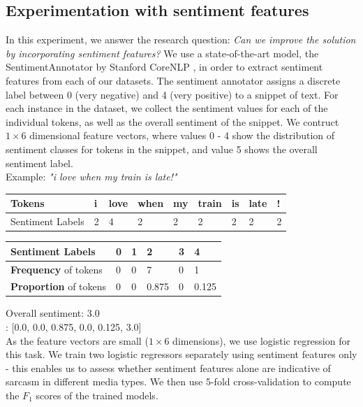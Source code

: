 \documentclass[12pt,a4paper]{article}
\begin{document}
\subsection{Experimentation with sentiment features}
\noindent In this experiment, we answer the research question: \textit{Can we improve the solution by incorporating sentiment features?} We use a state-of-the-art model, the SentimentAnnotator \cite{socher2013recursive} by Stanford CoreNLP \cite{manning2014stanford}, in order to extract sentiment features from each of our datasets. The sentiment annotator assigns a discrete label between 0 (very negative) and 4 (very positive) to a snippet of text. For each instance in the dataset, we collect the sentiment values for each of the individual tokens, as well as the overall sentiment of the snippet. We contruct $ 1 \times 6 $ dimensional feature vectors, where values 0 - 4 show the distribution of sentiment classes for tokens in the snippet, and value 5 shows the overall sentiment label.\\

\noindent Example: \textit{"i love when my train is late!"}\\

\begin{tabular}{|p{3cm}||p{0.2cm}p{1cm}p{1cm}p{1cm}p{1cm}p{0.8cm}p{1cm}p{1cm}|}
\hline 
Tokens & i & love & when & my & train & is & late & !\\ 
\hline 
Sentiment Labels & 2 & 4 & 2 & 2 & 2 & 2 & 2 & 2\\ 
\hline 
\end{tabular}
\vspace{10pt}

\begin{tabular}{|p{3.8cm}||p{1cm}|p{1cm}|p{1cm}|p{1cm}|p{1cm}|} 
	\hline 
	Sentiment Labels & {0} & {1} & {2} & {3} & {4}\\ 
	\hline 
	\textbf{Frequency} of tokens & 0 & 0 & 7 & 0 & 1\\ 
	\textbf{Proportion} of tokens & 0 & 0 & 0.875 & 0 & 0.125\\
	\hline  
\end{tabular}
\vspace{10pt}

{Overall sentiment}: 3.0\\
: [0.0, 0.0, 0.875, 0.0, 0.125, 3.0]\\

\noindent As the feature vectors are small ($1 \times 6$ dimensions), we use logistic regression for this task. We train two logistic regressors separately using sentiment features only - this enables us to assess whether sentiment features alone are indicative of sarcasm in different media types. We then use 5-fold cross-validation to compute the $F_1$ scores of the trained models.
\end{document}
